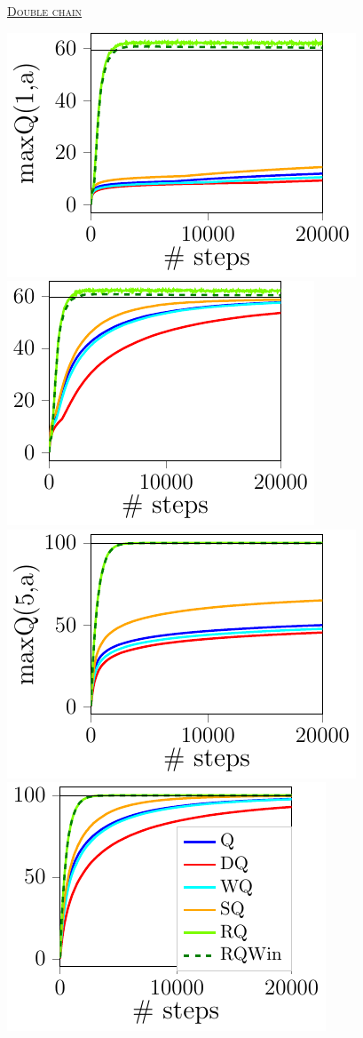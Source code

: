 \documentclass[portrait,a0paper,fontscale=0.312]{baposter}
\newcommand{\listhead}[1] {\textsc{\underline{#1}}}
\begin{document}
\begin{poster}
{\listhead{Double chain}\\
\begin{minipage}{0.5\textwidth}
  \includegraphics[scale=0.55]{./imgs/doubleChain/v1-1.pdf}
  \includegraphics[scale=0.55]{./imgs/doubleChain/v1-51.pdf}\\
  \includegraphics[scale=0.55]{./imgs/doubleChain/v5-1.pdf}
  \includegraphics[scale=0.55]{./imgs/doubleChain/v5-51.pdf}

\end{minipage}}
\end{poster}
\end{document}
